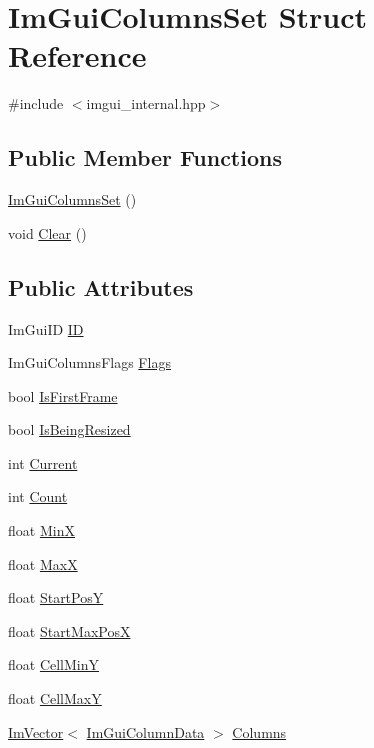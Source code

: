 \hypertarget{struct_im_gui_columns_set}{}\section{Im\+Gui\+Columns\+Set Struct Reference}
\label{struct_im_gui_columns_set}


{\ttfamily \#include $<$imgui\+\_\+internal.\+hpp$>$}

\subsection*{Public Member Functions}
\begin{DoxyCompactItemize}
\item 
\hyperlink{struct_im_gui_columns_set_a151a94550f1575639b6f8be0d63b7caa}{Im\+Gui\+Columns\+Set} ()
\item 
void \hyperlink{struct_im_gui_columns_set_acbaeb17ee3c2026ff36ecba69906eb6c}{Clear} ()
\end{DoxyCompactItemize}
\subsection*{Public Attributes}
\begin{DoxyCompactItemize}
\item 
Im\+Gui\+ID \hyperlink{struct_im_gui_columns_set_af0d52f764471e070d0beca0526090e10}{ID}
\item 
Im\+Gui\+Columns\+Flags \hyperlink{struct_im_gui_columns_set_adb2a5aea8ba94e54502d71844ec3e23b}{Flags}
\item 
bool \hyperlink{struct_im_gui_columns_set_a814bdfd8c72548d2c93675c8d6e974e9}{Is\+First\+Frame}
\item 
bool \hyperlink{struct_im_gui_columns_set_af9ef4186dd06147173a0e1dc12085399}{Is\+Being\+Resized}
\item 
int \hyperlink{struct_im_gui_columns_set_a6a8816ed50ec3ca5d673b25b667d845f}{Current}
\item 
int \hyperlink{struct_im_gui_columns_set_aaa3e86fc2582a6bb749172a04b9d934c}{Count}
\item 
float \hyperlink{struct_im_gui_columns_set_a953e9dc01eab7503a48644e051b61476}{MinX}
\item 
float \hyperlink{struct_im_gui_columns_set_acea08c0e12158b9db78d499f1bb1242b}{MaxX}
\item 
float \hyperlink{struct_im_gui_columns_set_a32611b7e09fb2dbdcc5342fecc3a0f6c}{Start\+PosY}
\item 
float \hyperlink{struct_im_gui_columns_set_a61470bb069a752930fc8a838e9f552d3}{Start\+Max\+PosX}
\item 
float \hyperlink{struct_im_gui_columns_set_ac7d198911e64be8c9ae7590cf1a91965}{Cell\+MinY}
\item 
float \hyperlink{struct_im_gui_columns_set_a6468f959f84876da6fee25698b796f04}{Cell\+MaxY}
\item 
\hyperlink{class_im_vector}{Im\+Vector}$<$ \hyperlink{struct_im_gui_column_data}{Im\+Gui\+Column\+Data} $>$ \hyperlink{struct_im_gui_columns_set_a7922acd94294791c3babf3ee92896d08}{Columns}
\end{DoxyCompactItemize}


